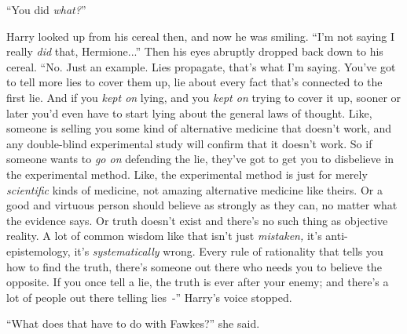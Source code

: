 ``You did \emph{what?}''

Harry looked up from his cereal then, and now he was smiling. ``I'm not saying I really \emph{did} that, Hermione...'' Then his eyes abruptly dropped back down to his cereal. ``No. Just an example. Lies propagate, that's what I'm saying. You've got to tell more lies to cover them up, lie about every fact that's connected to the first lie. And if you \emph{kept on} lying, and you \emph{kept on} trying to cover it up, sooner or later you'd even have to start lying about the general laws of thought. Like, someone is selling you some kind of alternative medicine that doesn't work, and any double-blind experimental study will confirm that it doesn't work. So if someone wants to \emph{go on} defending the lie, they've got to get you to disbelieve in the experimental method. Like, the experimental method is just for merely \emph{scientific} kinds of medicine, not amazing alternative medicine like theirs. Or a good and virtuous person should believe as strongly as they can, no matter what the evidence says. Or truth doesn't exist and there's no such thing as objective reality. A lot of common wisdom like that isn't just \emph{mistaken,} it's anti-epistemology, it's \emph{systematically} wrong. Every rule of rationality that tells you how to find the truth, there's someone out there who needs you to believe the opposite. If you once tell a lie, the truth is ever after your enemy; and there's a lot of people out there telling lies~-'' Harry's voice stopped.

``What does that have to do with Fawkes?'' she said.

